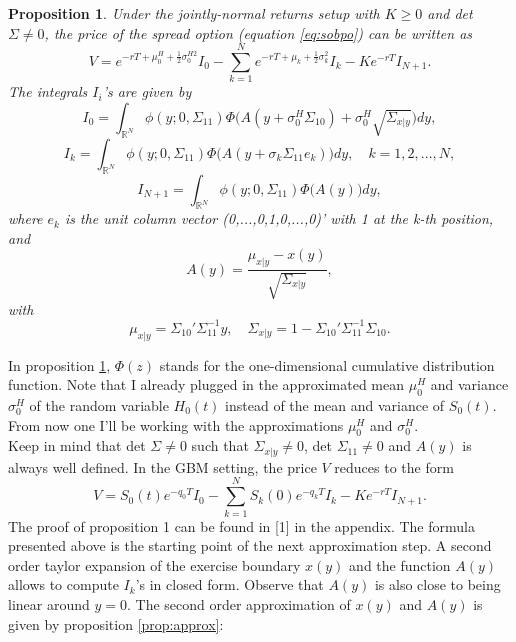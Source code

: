 \documentclass[a4paper]{article}
\newtheorem{prop}{Proposition}
\begin{document}
\begin{prop}
\label{prop:price}
Under the jointly-normal returns setup with $K \geq 0$ and det $\Sigma \neq 0$, the price of the spread option (equation \ref{eq:sobpo}) can be written as
$$V=e^{-rT+\mu_0^H+\frac{1}{2}\sigma_0^{H2}}I_0-\sum_{k=1}^Ne^{-rT+\mu_k+\frac{1}{2}\sigma_k^2}I_k-Ke^{-rT}I_{N+1}.$$
The integrals $I_i$'s are given by
$$I_0=\int_{\mathbb{R}^N}\phi(y;0,\Sigma_{11})\Phi\big(A(y+\sigma_0^H\Sigma_{10})+\sigma_0^H\sqrt{\Sigma_{x|y}}\big)dy,$$
$$I_k=\int_{\mathbb{R}^N}\phi(y;0,\Sigma_{11})\Phi\big(A(y+\sigma_k\Sigma_{11}e_k)\big)dy, \quad k=1,2,...,N,$$
$$I_{N+1}=\int_{\mathbb{R}^N}\phi(y;0,\Sigma_{11})\Phi\big(A(y)\big)dy,$$
where $e_k$ is the unit column vector (0,...,0,1,0,...,0)' with 1 at the k-th position, and
$$A(y)=\frac{\mu_{x|y}-x(y)}{\sqrt{\Sigma_{x|y}}},$$
with
\begin{equation}
\label{eq:inv}
\mu_{x|y}=\Sigma_{10}'\Sigma_{11}^{-1}y, \quad \Sigma_{x|y}=1-\Sigma_{10}'\Sigma_{11}^{-1}\Sigma_{10}.
\end{equation}
\end{prop}

In proposition \ref{prop:price}, $\Phi(z)$ stands for the one-dimensional cumulative distribution function. Note that I already plugged in the approximated mean $\mu_0^H$ and variance $\sigma_0^H$ of the random variable $H_0(t)$ instead of the mean and variance of $S_0(t)$. From now one I'll be working with the approximations $\mu_0^H$ and $\sigma_0^H$.\\
Keep in mind that det $\Sigma \neq 0$ such that $\Sigma_{x|y} \neq 0$, det $\Sigma_{11} \neq 0$ and $A(y)$ is always well defined. In the GBM setting, the price $V$ reduces to the form
\begin{equation}
\label{eq:cf}
V = S_0(t)e^{-q_0T}I_0-\sum_{k=1}^NS_k(0)e^{-q_kT}I_k-Ke^{-rT}I_{N+1}.
\end{equation}
The proof of proposition 1 can be found in [1] in the appendix. 
The formula presented above is the starting point of the next approximation step. A second order taylor expansion of the exercise boundary $x(y)$ and the function $A(y)$ allows to compute $I_k$'s in closed form. Observe that $A(y)$ is also close to being linear around $y=0$. The second order approximation of $x(y)$ and $A(y)$ is given by proposition \ref{prop:approx}:
\end{document}
